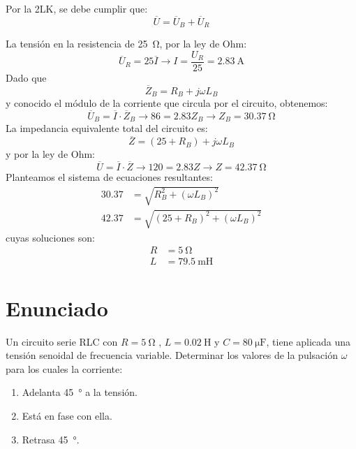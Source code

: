 Por la 2LK, se debe cumplir que:
\begin{equation*}
  \overline{U} = \overline{U}_B + \overline{U}_R
\end{equation*}


La tensión en la resistencia de \qty{25}{\ohm}, por la ley de Ohm:
\begin{equation*}
  \overline{U}_R = 25 \overline{I} \rightarrow I = \frac{U_R}{25} = \qty{2.83}{\ampere}
\end{equation*}
Dado que
\begin{equation*}
  \overline{Z}_B = R_B + j\omega L_B
\end{equation*}
y conocido el módulo de la corriente que circula por el circuito, obtenemos:
\begin{equation*}
  \overline{U}_B = \overline{I} \cdot \overline{Z}_B \rightarrow 86 = 2.83 Z_B \rightarrow Z_B = \qty{30.37}{\ohm}
\end{equation*}
La impedancia equivalente total del circuito es:
\begin{equation*}
  \overline{Z} = (25 + R_B) + j\omega L_B
\end{equation*}
y por la ley de Ohm:
\begin{equation*}
  \overline{U} = \overline{I} \cdot \overline{Z} \rightarrow 120 = 2.83 Z \rightarrow Z = \qty{42.37}{\ohm}
\end{equation*}
Planteamos el sistema de ecuaciones resultantes:
\begin{align*}
  30.37 &= \sqrt{R^2_B + (\omega L_B)^2}\\
  42.37 &= \sqrt{(25 + R_B)^2 + (\omega L_B)^2}
\end{align*}
cuyas soluciones son:
\begin{align*}
  R &= \qty{5}{\ohm}\\
  L &= \qty{79.5}{\milli\henry}
\end{align*}


\section{Enunciado}
Un circuito serie RLC con $R = \qty{5}{\ohm}$ , $L = \qty{0.02}{\henry}$ y $C=\qty{80}{\micro\farad}$, tiene aplicada una tensión senoidal de frecuencia variable. Determinar los valores de la pulsación $\omega$ para los cuales la corriente:
\begin{enumerate}
\item Adelanta \qty{45}{\degree} a la tensión.
\item Está en fase con ella.
\item Retrasa \qty{45}{\degree}.
\end{enumerate}

